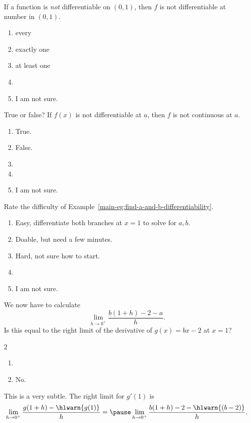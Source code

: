 \documentclass[aspectratio=169, 14pt, t]{beamer}  %
\begin{document}
\begin{poll}
  If a function is \emph{not} differentiable on \((0,1)\), then \(f\) is not differentiable at \underline{\hspace{1in}} number in \((0,1)\).

  \begin{enumerate}
    \item every
    \item exactly one
    \item at least one
    \item
    \item I am not sure.
  \end{enumerate}
\end{poll}

\begin{poll}
  True or false? If \(f(x)\) is not differentiable at \(a\), then \(f\) is not continuous at \(a\).

  \begin{enumerate}
    \item True.
    \item False.
    \item
    \item
    \item I am not sure.
  \end{enumerate}
\end{poll}

\begin{poll}
  Rate the difficulty of Example~\ref{main-eg:find-a-and-b-differentiability}.

  \begin{enumerate}
    \item Easy, differentiate both branches at \(x = 1\) to solve for \(a,b\).
    \item Doable, but need a few minutes.
    \item Hard, not sure how to start.
    \item
    \item I am not sure.
  \end{enumerate}
\end{poll}

\begin{poll}
  We now have to calculate \[\lim_{h \to 0^{+}} \frac{b(1+h) - 2 - a}{h}. \]  Is this equal to the right limit of the derivative of \(g(x) = bx - 2\) at \(x = 1\)?

  \begin{multicols}{2}
    \begin{enumerate}
      \item {} 
      \item No.
    \end{enumerate}
  \end{multicols}

  \pause This is a very subtle.  The right limit for \(g'(1)\) is
  \[
    \lim_{h \to 0^{+}} \frac{g(1 + h) - \hlwarn{g(1)}}{h}
    = \pause
    \lim_{h \to 0^{+}} \frac{b(1+h) - 2 - \hlwarn{(b - 2)}}{h}.
  \]
\end{poll}
\end{document}
